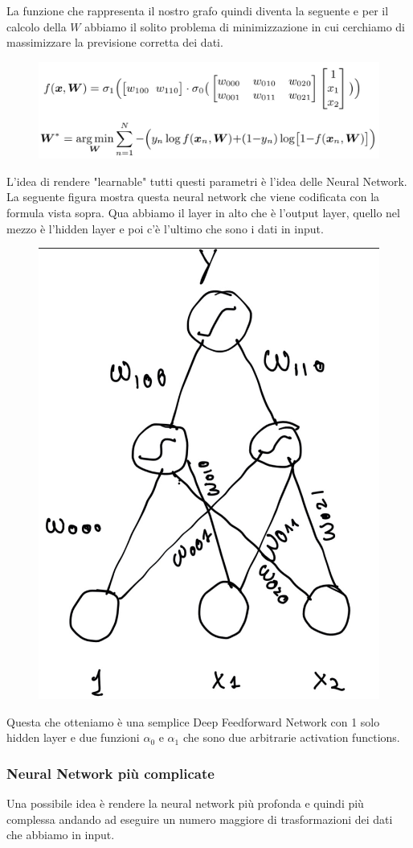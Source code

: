 \documentclass[14pt]{extreport}
\begin{document}
La funzione che rappresenta il nostro grafo quindi diventa la seguente e per il calcolo della $W$ abbiamo il solito problema di minimizzazione in cui
cerchiamo di massimizzare la previsione corretta dei dati.

\begin{figure}[H]
	\centering
	\includegraphics[width=0.9\linewidth]{366.jpeg}
\end{figure}

L'idea di rendere "learnable" tutti questi parametri è l'idea delle Neural Network. La seguente figura mostra questa neural network che viene
codificata con la formula vista sopra. Qua abbiamo il layer in alto che è l'output layer, quello nel mezzo è l'hidden layer e poi c'è l'ultimo che
sono i dati in input.

\begin{figure}[H]
	\centering
	\includegraphics[width=0.4\linewidth]{367.jpeg}
\end{figure}

Questa che otteniamo è una semplice Deep Feedforward Network con 1 solo hidden layer e due funzioni $\alpha_0$ e $\alpha_1$ che sono due arbitrarie
activation functions.


\subsubsection{Neural Network più complicate}

Una possibile idea è rendere la neural network più profonda e quindi più complessa andando ad eseguire un numero maggiore di trasformazioni dei dati
che abbiamo in input.
\end{document}
